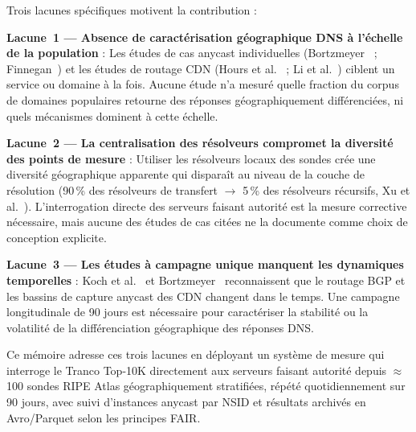 Trois lacunes spécifiques motivent la contribution :

\textbf{Lacune~1 --- Absence de caractérisation géographique DNS à l'échelle de la population} : Les études de cas anycast individuelles (Bortzmeyer~\cite{Bortzmeyer2013} ; Finnegan~\cite{Finnegan2018}) et les études de routage CDN (Hours et al.~\cite{Hours2016} ; Li et al.~\cite{Li2025}) ciblent un service ou domaine à la fois. Aucune étude n'a mesuré quelle fraction du corpus de domaines populaires retourne des réponses géographiquement différenciées, ni quels mécanismes dominent à cette échelle.

\textbf{Lacune~2 --- La centralisation des résolveurs compromet la diversité des points de mesure} : Utiliser les résolveurs locaux des sondes crée une diversité géographique apparente qui disparaît au niveau de la couche de résolution (90\,\% des résolveurs de transfert $\rightarrow$ 5\,\% des résolveurs récursifs, Xu et al.~\cite{Xu2023}). L'interrogation directe des serveurs faisant autorité est la mesure corrective nécessaire, mais aucune des études de cas citées ne la documente comme choix de conception explicite.

\textbf{Lacune~3 --- Les études à campagne unique manquent les dynamiques temporelles} : Koch et al.~\cite{Koch2021} et Bortzmeyer~\cite{Bortzmeyer2013} reconnaissent que le routage BGP et les bassins de capture anycast des CDN changent dans le temps. Une campagne longitudinale de 90 jours est nécessaire pour caractériser la stabilité ou la volatilité de la différenciation géographique des réponses DNS.

Ce mémoire adresse ces trois lacunes en déployant un système de mesure qui interroge le Tranco Top-10K directement aux serveurs faisant autorité depuis $\approx$100 sondes RIPE Atlas géographiquement stratifiées, répété quotidiennement sur 90 jours, avec suivi d'instances anycast par NSID et résultats archivés en Avro/Parquet selon les principes FAIR.
